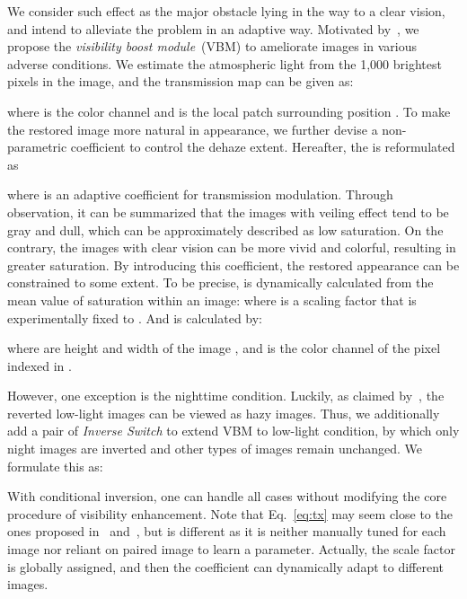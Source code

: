 \documentclass[letterpaper]{article} \usepackage{aaai23}  \usepackage{times}  \usepackage{helvet}  \usepackage{courier}  \usepackage[hyphens]{url}  \usepackage{graphicx} \urlstyle{rm} \def\UrlFont{\rm}  \usepackage{natbib}  \usepackage{caption} \frenchspacing  \setlength{\pdfpagewidth}{8.5in}  \setlength{\pdfpageheight}{11in}  \usepackage{algorithm}
\newcommand{\boostModuleName}{\textit{visibility boost module}}
\begin{document}
We consider such effect as the major obstacle lying in the way to a clear vision, and intend to alleviate the problem in an adaptive way. 
Motivated by~\cite{he2009single,liu2022image}, we propose the \boostModuleName~(VBM) to ameliorate images in various adverse conditions. We estimate the atmospheric light  from the 1,000 brightest pixels in the image, and the transmission map can be given as:
\begin{small}
    
\end{small}where  is the color channel and  is the local patch surrounding position .
To make the restored image more natural in appearance, we further devise a non-parametric coefficient  to control the dehaze extent. Hereafter, the  is reformulated as
\begin{small}
    
\end{small}where  is an adaptive coefficient for transmission modulation. Through observation, it can be summarized that the images with veiling effect tend to be gray and dull, which can be approximately described as low saturation. On the contrary, the images with clear vision can be more vivid and colorful, resulting in greater saturation. By introducing this coefficient, the restored appearance can be constrained to some extent. To be precise,  is dynamically calculated from the mean value of saturation  within an image:
where  is a scaling factor that is experimentally fixed to . And  is calculated by:
\begin{small}
    
\end{small}where  are height and width of the image , and  is the  color channel of the pixel indexed  in . 

However, one exception is the nighttime condition. Luckily, as claimed by~\citet{zhang2012enhancement}, the reverted low-light images can be viewed as hazy images. Thus, we additionally add a pair of \textit{Inverse Switch} to extend VBM to low-light condition, by which only night images are inverted and other types of images remain unchanged. We formulate this as:
\begin{small}
    
\end{small}With conditional inversion, one can handle all cases without modifying the core procedure of visibility enhancement. Note that Eq.~\eqref{eq:tx} may seem close to the ones proposed in~\cite{he2009single} and~\cite{liu2022image}, but is different as it is neither manually tuned for each image nor reliant on paired image to learn a parameter. Actually, the scale factor  is globally assigned, and then the coefficient  can dynamically adapt to different images.
\end{document}
